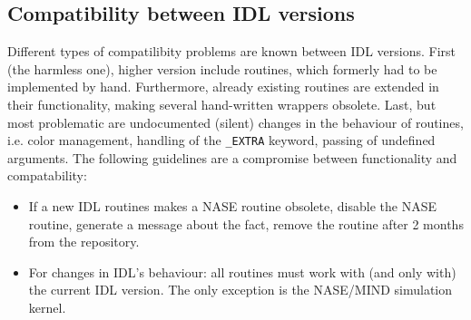 \documentclass[12pt]{article}
\begin{document}
\subsection{Compatibility between IDL versions}
Different types of compatilibity problems are known between IDL versions. First (the harmless one), higher version include routines, which formerly had to be implemented by hand. Furthermore, already existing routines are extended in their functionality, making several hand-written wrappers obsolete. Last, but most problematic are undocumented (silent) changes in the behaviour of routines, i.e. color management, handling of the \texttt{\_EXTRA} keyword, passing of undefined arguments. The following guidelines are a compromise between functionality and compatability:
\begin{itemize}
\item If a new IDL routines makes a NASE routine obsolete, disable the NASE routine, generate a message about the fact, remove the routine after 2 months from the repository.
\item For changes in IDL's behaviour: all routines must work with (and only with) the current IDL version. The only exception is the NASE/MIND simulation kernel.
\end{itemize}
\end{document}
